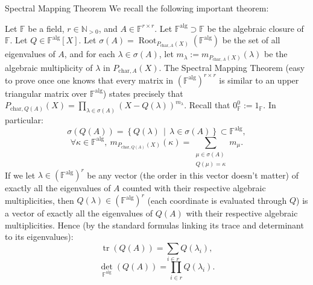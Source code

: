\begin{appendixitem}{Spectral Mapping Theorem}
    We recall the following important theorem:
    \begin{theorem}
        Let \( \mathbb{F} \) be a field, \( r \in \mathbb{N}_{>0} \), and \( A \in \mathbb{F}^{r \times r} \). Let \( \mathbb{F}^{\text{alg}} \supset \mathbb{F} \) be the algebraic closure of \( \mathbb{F} \). Let \( Q \in \mathbb{F}^{\text{alg}}\left[X\right] \). Let \( \sigma\left(A\right) = \operatorname{Root}_{P_{\text{char}, A}\left(X\right)}\left(\mathbb{F}^{\text{alg}}\right) \) be the set of all eigenvalues of \( A \), and for each \( \lambda \in \sigma\left(A\right) \), let \( m_\lambda := m_{P_{\text{char}, A}\left(X\right)}\left(\lambda\right) \) be the algebraic multiplicity of \( \lambda \) in \( P_{\text{char}, A}\left(X\right) \). The Spectral Mapping Theorem (easy to prove once one knows that every matrix in \( \left(\mathbb{F}^{\text{alg}}\right)^{r \times r} \) is similar to an upper triangular matrix over \( \mathbb{F}^{\text{alg}} \)) states precisely that \( P_{\text{char}, Q\left(A\right)}\left(X\right) = \prod_{\lambda \in \sigma\left(A\right)} \left(X - Q\left(\lambda\right)\right)^{m_\lambda} \). Recall that \( 0_{\mathbb{F}}^{0} := 1_{\mathbb{F}} \). In particular:
        \[
            \sigma\left(Q\left(A\right)\right) = \left\{ Q\left(\lambda\right) \,\middle|\, \lambda \in \sigma\left(A\right) \right\}\subset \mathbb{F}^{\text{alg}},
        \]
        \[
            \forall \kappa \in \mathbb{F}^{\text{alg}}, \ m_{P_{\text{char}, Q\left(A\right)}\left(X\right)}\left(\kappa\right) = \sum_{\substack{\mu \in \sigma\left(A\right) \\ Q\left(\mu\right) = \kappa}} m_{\mu}.
        \]
        If we let \( \lambda \in \left(\mathbb{F}^{\text{alg}}\right)^r \) be any vector (the order in this vector doesn't matter) of exactly all the eigenvalues of \( A \) counted with their respective algebraic multiplicities, then \( Q\left(\lambda\right)\in \left(\mathbb{F}^{\text{alg}}\right)^r \) (each coordinate is evaluated through \( Q \)) is a vector of exactly all the eigenvalues of \( Q\left(A\right) \) with their respective algebraic multiplicities. Hence (by the standard formulas linking its trace and determinant to its eigenvalues):
        \[
            \operatorname{tr}\left(Q\left(A\right)\right) = \sum_{i\in r} Q\left(\lambda_i\right),
        \]
        \[
            \operatorname{det}_{\mathbb{F}^{\text{alg}}}\left(Q\left(A\right)\right) = \prod_{i\in r} Q\left(\lambda_i\right).
        \]
    \end{theorem}
\end{appendixitem}
